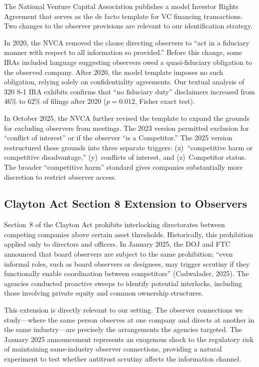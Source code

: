 The National Venture Capital Association publishes a model Investor Rights Agreement that serves as the de facto template for VC financing transactions. Two changes to the observer provisions are relevant to our identification strategy.

In 2020, the NVCA removed the clause directing observers to ``act in a fiduciary manner with respect to all information so provided.'' Before this change, some IRAs included language suggesting observers owed a quasi-fiduciary obligation to the observed company. After 2020, the model template imposes no such obligation, relying solely on confidentiality agreements. Our textual analysis of 320 S-1 IRA exhibits confirms that ``no fiduciary duty'' disclaimers increased from 46\% to 62\% of filings after 2020 ($p=0.012$, Fisher exact test).

In October 2025, the NVCA further revised the template to expand the grounds for excluding observers from meetings. The 2023 version permitted exclusion for ``conflict of interest'' or if the observer ``is a Competitor.'' The 2025 version restructured these grounds into three separate triggers: (x)~``competitive harm or competitive disadvantage,'' (y)~conflicts of interest, and (z)~Competitor status. The broader ``competitive harm'' standard gives companies substantially more discretion to restrict observer access.

\subsection{Clayton Act Section 8 Extension to Observers}

Section~8 of the Clayton Act prohibits interlocking directorates between competing companies above certain asset thresholds. Historically, this prohibition applied only to directors and officers. In January 2025, the DOJ and FTC announced that board observers are subject to the same prohibition: ``even informal roles, such as board observers or designees, may trigger scrutiny if they functionally enable coordination between competitors'' (Cadwalader, 2025). The agencies conducted proactive sweeps to identify potential interlocks, including those involving private equity and common ownership structures.

This extension is directly relevant to our setting. The observer connections we study---where the same person observes at one company and directs at another in the same industry---are precisely the arrangements the agencies targeted. The January 2025 announcement represents an exogenous shock to the regulatory risk of maintaining same-industry observer connections, providing a natural experiment to test whether antitrust scrutiny affects the information channel.